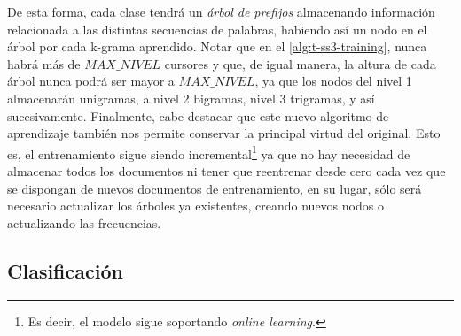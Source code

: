 De esta forma, cada clase tendrá un \emph{árbol de prefijos} almacenando información relacionada a las distintas secuencias de palabras, habiendo así un nodo en el árbol por cada k-grama aprendido.
Notar que en el \autoref{alg:t-ss3-training}, nunca habrá más de $MAX\_NIVEL$ cursores y que, de igual manera, la altura de cada árbol nunca podrá ser mayor a $MAX\_NIVEL$, ya que los nodos del nivel 1 almacenarán unigramas, a nivel 2 bigramas, nivel 3 trigramas, y así sucesivamente.
Finalmente, cabe destacar que este nuevo algoritmo de aprendizaje también nos permite conservar la principal virtud del original.
Esto es, el entrenamiento sigue siendo incremental\footnote{Es decir, el modelo sigue soportando \emph{online learning}.} ya que no hay necesidad de almacenar todos los documentos ni tener que reentrenar desde cero cada vez que se dispongan de nuevos documentos de entrenamiento, en su lugar, sólo será necesario actualizar los árboles ya existentes, creando nuevos nodos o actualizando las frecuencias.

\subsection{Clasificación}

